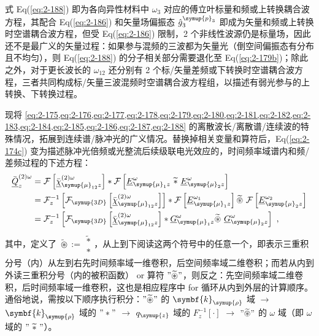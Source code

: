 式 Eq(\ref{eq:2-188}) 即为各向异性材料中 $\omega_{3}$ 对应的傅立叶标量和频或上转换耦合波方程，其配合 Eq(\ref{eq:2-186}) 和矢量场偏振态 $\hat{g}^{\symup{p}_{3}}_{3}$ 即成为矢量和频或上转换时空谱耦合波方程，但受 Eq(\ref{eq:2-186}) 限制，2 个非线性波源仍是标量场，因此还不是最广义的矢量过程：如果参与混频的三波都为矢量光（倒空间偏振态有分布且不均匀），则 Eq(\ref{eq:2-188}) 的分子相关部分需要退化至 Eq(\ref{eq:2-179b})；除此之外，对于更长波长的 $\omega_{12}$ 还分别有 2 个标/矢量差频或下转换时空谱耦合波方程，三者共同构成标/矢量三波混频时空谱耦合波方程组，以描述有弱光参与的上转换、下转换过程。

现将 \cref{eq:2-175,eq:2-176,eq:2-177,eq:2-178,eq:2-179,eq:2-180,eq:2-181,eq:2-182,eq:2-183,eq:2-184,eq:2-185,eq:2-186,eq:2-187,eq:2-188} 的离散波长/离散谱/连续波的特殊情况，拓展到连续谱/脉冲光的广义情况。替换掉相关变量和算符后，Eq(\ref{eq:2-174c}) 变为描述脉冲光倍频或光整流后续级联电光效应\cite{jangMulticycleTerahertzPulse2020}的，时间频率域谱内和频/差频过程的下述方程：
\begin{subequations} \label{eq:2-189}
	\abovedisplayskip=13pt
	\belowdisplayskip=13pt
	\begin{align}
		\bar{\underline{Q}}^{(2)\omega}_{z} &= \mathcal F \left[ \bar{\underline{\chi}}^{(2)\omega}_{ {\symup{\mu}}_{12}z} \right] * \mathcal F \left[ \underline{E}^\omega_{{\symup{\mu}}_1 z}\ \widetilde *\ \underline{E}^\omega_{{\symup{\mu}}_2 z} \right]  \label{eq:2-189a} \\ &= \mathcal F^{-1}_{z} \left[ \mathcal F_{\symup{3D}} \left[ \bar{\underline{\chi}}^{(2)\omega}_{ {\symup{\mu}}_{12}z} \right] \right] * \mathcal F \left[ \underline{E}^{\omega_1}_{{\symup{\mu}}_1 z} \right] \widetilde \circledast\ \mathcal F \left[ \underline{E}^{\omega_2}_{{\symup{\mu}}_2 z} \right] \label{eq:2-189b} \\ &= \mathcal F^{-1}_{z} \left[ \mathcal F_{\symup{3D}} \left[ \bar{\underline{\chi}}^{(2)\omega}_{ {\symup{\mu}}_{12}z} \right] * \underline{G}^{\omega}_{{\symup{\mu}}_1 z} \widetilde \circledast\ \underline{G}^{\omega}_{{\symup{\mu}}_2 z} \right] \label{eq:2-189c}~,
	\end{align}
\end{subequations}
其中，定义了 $\widetilde \circledast := \begin{smallmatrix} \widetilde * \\ * \end{smallmatrix}$，从上到下阅读这两个符号中的任意一个，即表示三重积分号（内）从左到右先时间频率域一维卷积，后空间频率域二维卷积；而若从内到外读三重积分号（内的被积函数） or 算符 $"\widetilde \circledast"$，则反之：先空间频率域二维卷积，后时间频率域一维卷积，这也是相应程序中 for 循环从内到外层的计算顺序。通俗地说，需按以下顺序执行积分：$"\widetilde \circledast"$ 的 $\symbf{k}_{\symup{\rho}}$ 域 $\to$ $\symbf{k}_{\symup{\rho}}$ 域的 $"*"$ $\to$ $q_{\symup{z}}$ 域的 $F^{-1}_{z} \left[ \cdot \right]$ $\to$ $"\widetilde \circledast"$ 的 $\omega$ 域（即 $\omega$ 域的 $"\ \widetilde *\ "$）。

